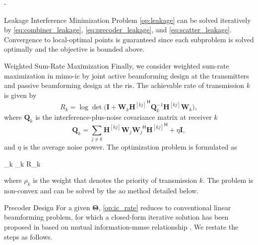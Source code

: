 \begin{section}{-}
\begin{subsection}{Leakage Interference Minimization}
		Problem \eqref{op:leakage} can be solved iteratively by \eqref{eq:combiner_leakage}, \eqref{eq:precoder_leakage}, and \eqref{eq:scatter_leakage}.
		Convergence to local-optimal points is guaranteed since each subproblem is solved optimally and the objective is bounded above.

	\end{subsection}

	\begin{subsection}{Weighted Sum-Rate Maximization}
		Finally, we consider weighted sum-rate maximization in \gls{mimo}-\gls{ic} by joint active beamforming design at the transmitters and passive beamforming design at the \gls{ris}.
		The achievable rate of transmission $k$ is given by
		\begin{equation}
			R_k = \log \det \biggl(\mathbf{I} + \mathbf{W}_k {\mathbf{H}^{[kj]}}^\mathsf{H} \mathbf{Q}_k^{-1} {\mathbf{H}^{[kj]}} \mathbf{W}_k\biggr),
		\end{equation}
		where $\mathbf{Q}_k$ is the interference-plus-noise covariance matrix at receiver $k$
		\begin{equation}
			\mathbf{Q}_k = \sum_{j \ne k} {\mathbf{H}^{[kj]}} \mathbf{W}_j {\mathbf{W}_j}^\mathsf{H} {\mathbf{H}^{[kj]}}^\mathsf{H} + \eta \mathbf{I},
		\end{equation}
		and $\eta$ is the average noise power.
		The optimization problem is formulated as
		\begin{maxi!}
			{}{\sum_k \rho_k R_k}{\label{op:ic_rate}}{\label{ob:ic_rate}}
		\end{maxi!}
		where $\rho_k$ is the weight that denotes the priority of transmission $k$.
		The problem is non-convex and can be solved by the \gls{ao} method detailed below.

		\begin{subsubsection}{Precoder Design}
			For a given $\mathbf{\Theta}$, \eqref{op:ic_rate} reduces to conventional linear beamforming problem, for which a closed-form iterative solution has been proposed in \cite{Negro2010} based on mutual information-\gls{mmse} relationship \cite{Guo2005}.
			We restate the steps as follows.


\end{subsubsection}
\end{subsection}
\end{section}
